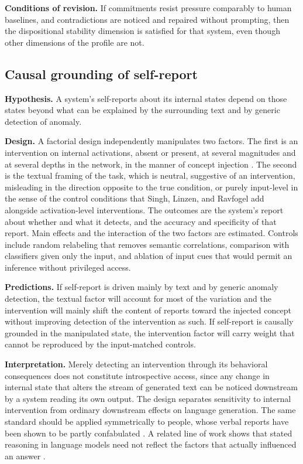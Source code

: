\documentclass[12pt]{article}
\theoremstyle{definition}
\theoremstyle{plain}
\begin{document}
\textbf{Conditions of revision.} If commitments resist pressure comparably to human baselines, and contradictions are noticed and repaired without prompting, then the dispositional stability dimension is satisfied for that system, even though other dimensions of the profile are not.

\subsection{Causal grounding of self-report}

\textbf{Hypothesis.} A system's self-reports about its internal states depend on those states beyond what can be explained by the surrounding text and by generic detection of anomaly.

\textbf{Design.} A factorial design independently manipulates two factors. The first is an intervention on internal activations, absent or present, at several magnitudes and at several depths in the network, in the manner of concept injection \cite{lindsey2025}. The second is the textual framing of the task, which is neutral, suggestive of an intervention, misleading in the direction opposite to the true condition, or purely input-level in the sense of the control conditions that Singh, Linzen, and Ravfogel \cite{singh2026} add alongside activation-level interventions. The outcomes are the system's report about whether and what it detects, and the accuracy and specificity of that report. Main effects and the interaction of the two factors are estimated. Controls include random relabeling that removes semantic correlations, comparison with classifiers given only the input, and ablation of input cues that would permit an inference without privileged access.

\textbf{Predictions.} If self-report is driven mainly by text and by generic anomaly detection, the textual factor will account for most of the variation and the intervention will mainly shift the content of reports toward the injected concept without improving detection of the intervention as such. If self-report is causally grounded in the manipulated state, the intervention factor will carry weight that cannot be reproduced by the input-matched controls.

\textbf{Interpretation.} Merely detecting an intervention through its behavioral consequences does not constitute introspective access, since any change in internal state that alters the stream of generated text can be noticed downstream by a system reading its own output. The design separates sensitivity to internal intervention from ordinary downstream effects on language generation. The same standard should be applied symmetrically to people, whose verbal reports have been shown to be partly confabulated \cite{nisbett1977, johansson2005}. A related line of work shows that stated reasoning in language models need not reflect the factors that actually influenced an answer \cite{turpin2023}.
\end{document}
